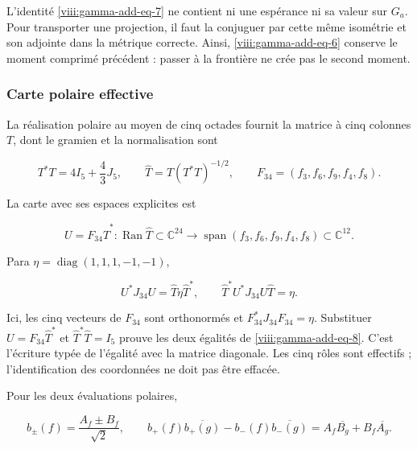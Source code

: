L'identité \eqref{viii:gamma-add-eq-7} ne contient ni une espérance ni sa valeur sur \(G_a\). Pour transporter une projection, il faut la conjuguer par cette même isométrie et son adjointe dans la métrique correcte. Ainsi, \eqref{viii:gamma-add-eq-6} conserve le moment comprimé précédent : passer à la frontière ne crée pas le second moment.

\subsubsection{Carte polaire effective}
\label{viii:gamma-add-sub-220}

La réalisation polaire au moyen de cinq octades fournit la matrice à cinq
colonnes \(T\), dont le gramien et la normalisation sont

\begin{equation}
T^*T=4I_5+\frac43J_5,\qquad
\widehat T=T(T^*T)^{-1/2},\qquad
F_{34}=(f_3,f_6,f_9,f_4,f_8).
\label{viii:gamma-add-display-18}
\end{equation}

La carte avec ses espaces explicites est

\begin{equation}
U=F_{34}\widehat T^*:
\operatorname{Ran}\widehat T\subset\mathbb C^{24}
\longrightarrow\operatorname{span}(f_3,f_6,f_9,f_4,f_8)\subset\mathbb C^{12}.
\label{viii:gamma-add-display-19}
\end{equation}

Para \(\eta=\operatorname{diag}(1,1,1,-1,-1)\),

\begin{equation}
U^*J_{34}U=\widehat T\eta\widehat T^*,\qquad
\widehat T^*U^*J_{34}U\widehat T=\eta.
\label{viii:gamma-add-eq-8}
\end{equation}

Ici, les cinq vecteurs de \(F_{34}\) sont orthonormés et \(F_{34}^*J_{34}F_{34}=\eta\). Substituer \(U=F_{34}\widehat T^*\) et \(\widehat T^*\widehat T=I_5\) prouve les deux égalités de \eqref{viii:gamma-add-eq-8}. C'est l'écriture typée de l'égalité avec la matrice diagonale. Les cinq rôles sont effectifs ; l'identification des coordonnées ne doit pas être effacée.

Pour les deux évaluations polaires,

\begin{equation}
b_\pm(f)=\frac{A_f\pm B_f}{\sqrt2},\qquad
b_+(f)\overline{b_+(g)}-b_-(f)\overline{b_-(g)}
=A_f\overline{B_g}+B_f\overline{A_g}.
\label{viii:gamma-add-eq-9}
\end{equation}

